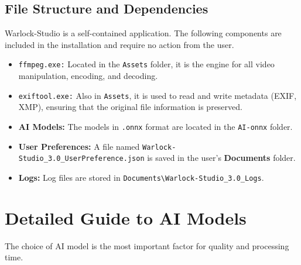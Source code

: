 \documentclass[11pt, a4paper]{article}
\newcommand{\inlinecode}[1]{\colorbox{WarlockLightGray}{\small\texttt{#1}}}
\begin{document}
\subsection{File Structure and Dependencies}
\begin{infobox}
Warlock-Studio is a self-contained application. The following components are included in the installation and require no action from the user.
\end{infobox}
\begin{itemize}[leftmargin=*]
    \item \inlinecode{ffmpeg.exe:} Located in the \texttt{Assets} folder, it is the engine for all video manipulation, encoding, and decoding.
    \item \inlinecode{exiftool.exe:} Also in \texttt{Assets}, it is used to read and write metadata (EXIF, XMP), ensuring that the original file information is preserved.
    \item \textbf{AI Models:} The models in \texttt{.onnx} format are located in the \texttt{AI-onnx} folder.
    \item \textbf{User Preferences:} A file named \inlinecode{Warlock-Studio_3.0_UserPreference.json} is saved in the user's \textbf{Documents} folder.
    \item \textbf{Logs:} Log files are stored in \texttt{Documents\textbackslash Warlock-Studio_3.0_Logs}.
\end{itemize}


\section{Detailed Guide to AI Models}
The choice of AI model is the most important factor for quality and processing time.
\end{document}
